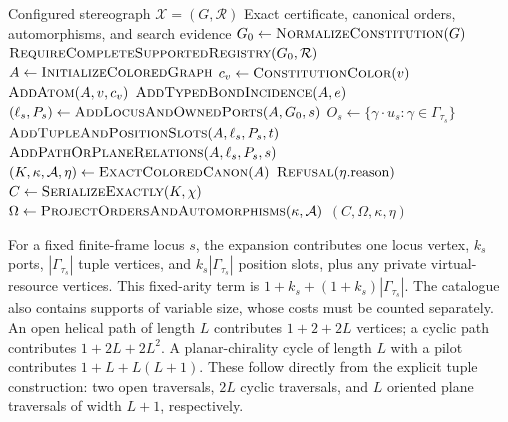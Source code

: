 \documentclass[pdflatex,sn-mathphys-num,referee,lineno]{sn-jnl}
\theoremstyle{plain}
\theoremstyle{remark}
\theoremstyle{definition}
\begin{document}
\begin{algorithm}[htbp]
\caption{Exact canonicalization of a configured molecular stereograph}
\label{alg:canonicalization}
\begin{algorithmic}[1]
\Require Configured stereograph \(\mathcal X=(G,\mathcal R)\)
\Ensure Exact certificate, canonical orders, automorphisms, and search evidence
\State \(G_0\gets\Call{NormalizeConstitution}{G}\)
\State \(\Call{RequireCompleteSupportedRegistry}{G_0,\mathcal R}\)
\State \(A\gets\Call{InitializeColoredGraph}{}\)
  \State \(c_v\gets\Call{ConstitutionColor}{v}\)
  \State \(\Call{AddAtom}{A,v,c_v}\)
\EndFor
{}
  \State \(\Call{AddTypedBondIncidence}{A,e}\)
\EndFor
{}
  \State \((\ell_s,P_s)\gets\Call{AddLocusAndOwnedPorts}{A,G_0,s}\)
    \State \(O_s\gets\{\gamma\cdot u_s:\gamma\in\Gamma_{\tau_s}\}\)
      \State \(\Call{AddTupleAndPositionSlots}{A,\ell_s,P_s,t}\)
    \EndFor
  \Else
    \State \(\Call{AddPathOrPlaneRelations}{A,\ell_s,P_s,s}\)
  \EndIf
\EndFor
\State \((K,\kappa,\mathcal A,\eta)\gets\Call{ExactColoredCanon}{A}\)
  \State \Return \(\Call{Refusal}{\eta.\mathrm{reason}}\)
\EndIf
\State \(C\gets\Call{SerializeExactly}{K,\chi}\)
\State \(\Omega\gets\Call{ProjectOrdersAndAutomorphisms}{\kappa,\mathcal A}\)
\State \Return \((C,\Omega,\kappa,\eta)\)
\end{algorithmic}
\end{algorithm}

For a fixed finite-frame locus \(s\), the expansion contributes one locus
vertex, \(k_s\) ports, \(|\Gamma_{\tau_s}|\) tuple vertices, and
\(k_s|\Gamma_{\tau_s}|\) position slots, plus any private virtual-resource
vertices. This fixed-arity term is
\(1+k_s+(1+k_s)|\Gamma_{\tau_s}|\). The catalogue also contains supports of
variable size, whose costs must be counted separately. An open helical path
of length \(L\) contributes \(1+2+2L\) vertices; a cyclic path contributes
\(1+2L+2L^2\). A planar-chirality cycle of length \(L\) with a pilot
contributes \(1+L+L(L+1)\). These follow directly from the explicit tuple
construction: two open traversals, \(2L\) cyclic traversals, and \(L\)
oriented plane traversals of width \(L+1\), respectively.
\end{document}
